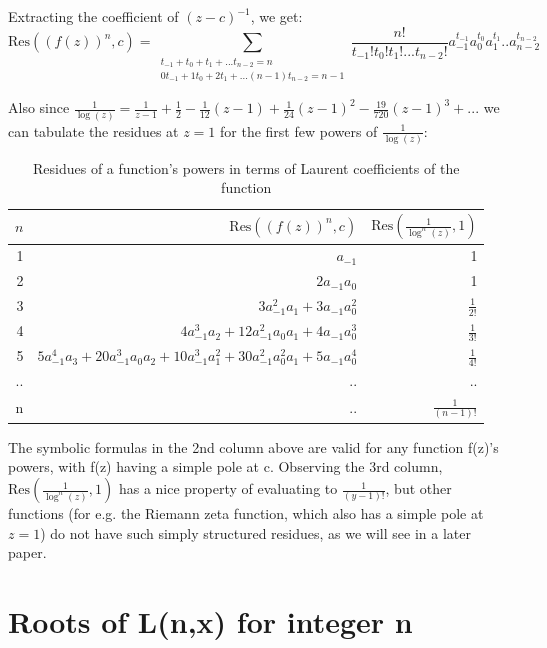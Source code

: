 \documentclass[a4paper,11pt,twoside]{amsart}
\newcommand\Res{\mathrm{Res}}
\begin{document}
Extracting the coefficient of $(z-c)^{-1}$, we get:
$$\Res((f(z))^n,c) =  
\sum\limits_{\substack{t_{-1} + t_0 + t_1 + ... t_{n-2} = n \\ 0t_{-1} + 1t_0 + 2t_1 + ... (n-1)t_{n-2} = n-1}} \frac{n!}{t_{-1}!t_{0}!t_{1}!...t_{n-2}!} a_{-1}^{t_{-1}} a_{0}^{t_0}a_{1}^{t_1}..a_{n-2}^{t_{n-2}}$$
 
Also since $\frac{1}{\log(z)} = \frac{1}{z-1} + \frac{1}{2} - \frac{1}{12} (z-1) + \frac{1}{24}(z-1)^2 - \frac{19}{720}(z-1)^3 + ...$ we can tabulate the residues at $z=1$ for the first few powers of $\frac{1}{\log(z)}$:

\begin{table}[H]
  \begin{center}
    \begin{tabular}{r|r|r} %
      $n$ & $\Res\left((f(z))^n,c\right)$ &  $\Res\left(\frac{1}{\log^{n}(z)},1\right)$\\
      \hline
      1 &  $a_{-1}$ & 1\\
      2 &  $2a_{-1}a_{0}$ & 1\\
      3 &  $3a_{-1}^2 a_{1} + 3a_{-1} a_{0}^2$ & $\frac{1}{2!}$\\
      4 &  $4a_{-1}^3 a_{2} + 12a_{-1}^2 a_{0} a_{1} + 4a_{-1} a_{0}^3$ & $\frac{1}{3!}$\\
      5 &  $5a_{-1}^4 a_{3} + 20a_{-1}^3 a_{0} a_{2} + 10a_{-1}^3 a_{1}^2 + 30a_{-1}^2 a_{0}^2 a_{1} + 5a_{-1} a_{0}^4$ & $\frac{1}{4!}$\\
      .. & .. & ..\\
      n & .. & $\frac{1}{(n-1)!}$
    \end{tabular}
    \caption{Residues of a function's powers in terms of Laurent coefficients of the function}
  \end{center}
\end{table}
\vspace{-2em}
The symbolic formulas in the 2nd column above are valid for any function f(z)'s powers, with f(z) having a simple pole at c. Observing the 3rd column, $\Res\left(\frac{1}{\log^{n}(z)},1\right)$ has a nice property of evaluating to $\frac{1}{(y-1)!}$, but other functions (for e.g. the Riemann zeta function, which also has a simple pole at $z=1$) do not have such simply structured residues, as we will see in a later paper. 

\section{Roots of L(n,x) for integer n}
\end{document}
